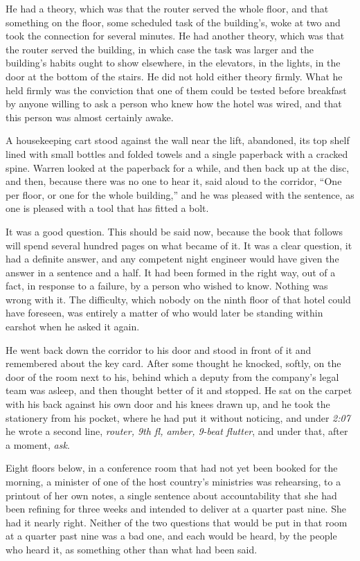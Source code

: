 He had a theory, which was that the router served the whole floor, and that something on the floor, some scheduled task of the building's, woke at two and took the connection for several minutes. He had another theory, which was that the router served the building, in which case the task was larger and the building's habits ought to show elsewhere, in the elevators, in the lights, in the door at the bottom of the stairs. He did not hold either theory firmly. What he held firmly was the conviction that one of them could be tested before breakfast by anyone willing to ask a person who knew how the hotel was wired, and that this person was almost certainly awake.

A housekeeping cart stood against the wall near the lift, abandoned, its top shelf lined with small bottles and folded towels and a single paperback with a cracked spine. Warren looked at the paperback for a while, and then back up at the disc, and then, because there was no one to hear it, said aloud to the corridor, ``One per floor, or one for the whole building,'' and he was pleased with the sentence, as one is pleased with a tool that has fitted a bolt.

It was a good question. This should be said now, because the book that follows will spend several hundred pages on what became of it. It was a clear question, it had a definite answer, and any competent night engineer would have given the answer in a sentence and a half. It had been formed in the right way, out of a fact, in response to a failure, by a person who wished to know. Nothing was wrong with it. The difficulty, which nobody on the ninth floor of that hotel could have foreseen, was entirely a matter of who would later be standing within earshot when he asked it again.

He went back down the corridor to his door and stood in front of it and remembered about the key card. After some thought he knocked, softly, on the door of the room next to his, behind which a deputy from the company's legal team was asleep, and then thought better of it and stopped. He sat on the carpet with his back against his own door and his knees drawn up, and he took the stationery from his pocket, where he had put it without noticing, and under \emph{2:07} he wrote a second line, \emph{router, 9th fl, amber, 9-beat flutter}, and under that, after a moment, \emph{ask}.

Eight floors below, in a conference room that had not yet been booked for the morning, a minister of one of the host country's ministries was rehearsing, to a printout of her own notes, a single sentence about accountability that she had been refining for three weeks and intended to deliver at a quarter past nine. She had it nearly right. Neither of the two questions that would be put in that room at a quarter past nine was a bad one, and each would be heard, by the people who heard it, as something other than what had been said.

